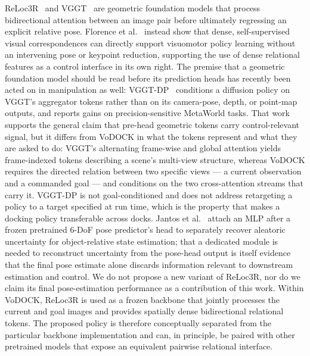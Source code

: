 \documentclass[letterpaper, 10 pt, conference]{IEEEtran}  %
\begin{document}
ReLoc3R~\cite{c4} and VGGT~\cite{vggt2025} are geometric foundation models that process bidirectional attention between an image pair before ultimately regressing an explicit relative pose. Florence et al.~\cite{florence2020correspondence} instead show that dense, self-supervised visual correspondences can directly support visuomotor policy learning without an intervening pose or keypoint reduction, supporting the use of dense relational features as a control interface in its own right. The premise that a geometric foundation model should be read before its prediction heads has recently been acted on in manipulation as well: VGGT-DP~\cite{ge2025vggtdp} conditions a diffusion policy on VGGT's aggregator tokens rather than on its camera-pose, depth, or point-map outputs, and reports gains on precision-sensitive MetaWorld tasks. That work supports the general claim that pre-head geometric tokens carry control-relevant signal, but it differs from VoDOCK in what the tokens represent and what they are asked to do: VGGT's alternating frame-wise and global attention yields frame-indexed tokens describing a scene's multi-view structure, whereas VoDOCK requires the directed relation between two specific views --- a current observation and a commanded goal --- and conditions on the two cross-attention streams that carry it. VGGT-DP is not goal-conditioned and does not address retargeting a policy to a target specified at run time, which is the property that makes a docking policy transferable across docks. Jantos et al.~\cite{jantos2025aleatoric} attach an MLP after a frozen pretrained 6-DoF pose predictor's head to separately recover aleatoric uncertainty for object-relative state estimation; that a dedicated module is needed to reconstruct uncertainty from the pose-head output is itself evidence that the final pose estimate alone discards information relevant to downstream estimation and control. We do not propose a new variant of ReLoc3R, nor do we claim its final pose-estimation performance as a contribution of this work. Within VoDOCK, ReLoc3R is used as a frozen backbone that jointly processes the current and goal images and provides spatially dense bidirectional relational tokens. The proposed policy is therefore conceptually separated from the particular backbone implementation and can, in principle, be paired with other pretrained models that expose an equivalent pairwise relational interface.
\end{document}
